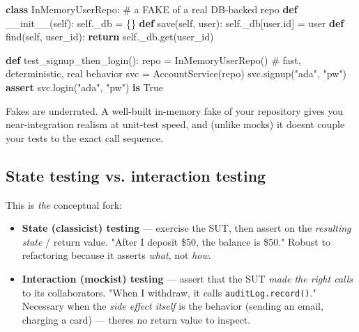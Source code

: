 \documentclass[11pt]{article}
\providecommand{\tightlist}{\setlength{\itemsep}{1pt}\setlength{\parskip}{0pt}}
\newenvironment{Shaded}{\begin{snugshade}}{\end{snugshade}}
\newcommand{\BuiltInTok}[1]{\textcolor[rgb]{0.50,0.55,0.55}{#1}}
\newcommand{\CommentTok}[1]{\textcolor[rgb]{0.48,0.49,0.49}{#1}}
\newcommand{\ControlFlowTok}[1]{\textcolor[rgb]{0.99,0.74,0.29}{\textbf{#1}}}
\newcommand{\FunctionTok}[1]{\textcolor[rgb]{0.56,0.27,0.68}{#1}}
\newcommand{\KeywordTok}[1]{\textcolor[rgb]{0.81,0.81,0.76}{\textbf{#1}}}
\newcommand{\NormalTok}[1]{\textcolor[rgb]{0.81,0.81,0.76}{#1}}
\newcommand{\OperatorTok}[1]{\textcolor[rgb]{0.81,0.81,0.76}{#1}}
\newcommand{\StringTok}[1]{\textcolor[rgb]{0.96,0.31,0.31}{#1}}
\newcommand{\VariableTok}[1]{\textcolor[rgb]{0.15,0.68,0.68}{#1}}
\begin{document}
\begin{Shaded}
\begin{Highlighting}[]
\KeywordTok{class}\NormalTok{ InMemoryUserRepo:           }\CommentTok{\# a FAKE of a real DB{-}backed repo}
    \KeywordTok{def} \FunctionTok{\_\_init\_\_}\NormalTok{(}\VariableTok{self}\NormalTok{):}
        \VariableTok{self}\NormalTok{.\_db }\OperatorTok{=}\NormalTok{ \{\}}
    \KeywordTok{def}\NormalTok{ save(}\VariableTok{self}\NormalTok{, user):}
        \VariableTok{self}\NormalTok{.\_db[user.}\BuiltInTok{id}\NormalTok{] }\OperatorTok{=}\NormalTok{ user}
    \KeywordTok{def}\NormalTok{ find(}\VariableTok{self}\NormalTok{, user\_id):}
        \ControlFlowTok{return} \VariableTok{self}\NormalTok{.\_db.get(user\_id)}

\KeywordTok{def}\NormalTok{ test\_signup\_then\_login():}
\NormalTok{    repo }\OperatorTok{=}\NormalTok{ InMemoryUserRepo()      }\CommentTok{\# fast, deterministic, real behavior}
\NormalTok{    svc }\OperatorTok{=}\NormalTok{ AccountService(repo)}
\NormalTok{    svc.signup(}\StringTok{"ada"}\NormalTok{, }\StringTok{"pw"}\NormalTok{)}
    \ControlFlowTok{assert}\NormalTok{ svc.login(}\StringTok{"ada"}\NormalTok{, }\StringTok{"pw"}\NormalTok{) }\KeywordTok{is} \VariableTok{True}
\end{Highlighting}
\end{Shaded}

Fakes are underrated. A well-built in-memory fake of your repository gives you near-integration realism at unit-test speed, and (unlike mocks) it doesn\textquotesingle t couple your tests to the exact call sequence.

\subsection{State testing vs. interaction testing}\label{state-testing-vs-interaction-testing}

This is \emph{the} conceptual fork:

\begin{itemize}
\tightlist
\item
  \textbf{State (classicist) testing} --- exercise the SUT, then assert on the \emph{resulting state} / return value. "After I deposit \$50, the balance is \$50." Robust to refactoring because it asserts \emph{what}, not \emph{how}.
\item
  \textbf{Interaction (mockist) testing} --- assert that the SUT \emph{made the right calls} to its collaborators. "When I withdraw, it calls \texttt{auditLog.record()}." Necessary when the \emph{side effect itself} is the behavior (sending an email, charging a card) --- there\textquotesingle s no return value to inspect.
\end{itemize}
\end{document}
